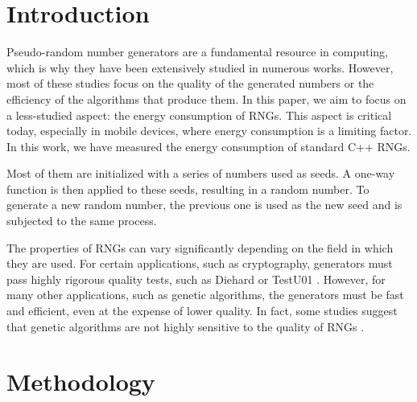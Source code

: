 \documentclass[sigconf]{acmart}
\begin{document}


\maketitle

\section{Introduction}
\label{sec:introduction}

Pseudo-random number generators \cite{marsaglia2003random} are a fundamental resource in computing, which is why they have been extensively studied in numerous works. However, most of these studies focus on the quality of the generated numbers or the efficiency of the algorithms that produce them. In this paper, we aim to focus on a less-studied aspect: the energy consumption of RNGs. This aspect is critical today, especially in mobile devices, where energy consumption is a limiting factor. In this work, we have measured the energy consumption of standard C++ RNGs.

Most of them are initialized with a series of numbers used as seeds. A one-way function is then applied to these seeds, resulting in a random number. To generate a new random number, the previous one is used as the new seed and is subjected to the same process.

The properties of RNGs can vary significantly depending on the field in which they are used. For certain applications, such as cryptography, generators must pass highly rigorous quality tests, such as Diehard \cite{marsaglia1997diehard} or TestU01 \cite{testu01}. However, for many other applications, such as genetic algorithms, the generators must be fast and efficient, even at the expense of lower quality. In fact, some studies suggest that genetic algorithms are not highly sensitive to the quality of RNGs \cite{cardenas2011sensitiveness}.

\section{Methodology}
\label{sec:methodology}
\end{document}

